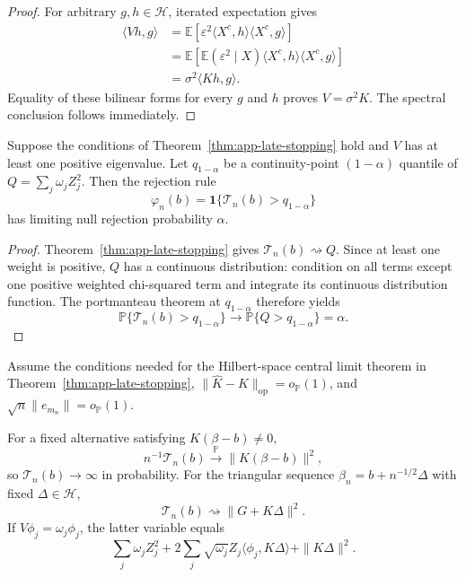 \begin{proof}
For arbitrary $g,h\in\mathcal H$, iterated expectation gives
\begin{align*}
    \langle Vh,g\rangle
    &=\mathbb E\!\left[
       \varepsilon^2\langle X^c,h\rangle\langle X^c,g\rangle
      \right] \\
    &=\mathbb E\!\left[
       \mathbb E(\varepsilon^2\mid X)
       \langle X^c,h\rangle\langle X^c,g\rangle
      \right] \\
    &=\sigma^2\langle Kh,g\rangle.
\end{align*}
Equality of these bilinear forms for every $g$ and $h$ proves
$V=\sigma^2K$.  The spectral conclusion follows immediately.
\end{proof}

\begin{corollary}
\label{cor:app-asymptotic-size}
Suppose the conditions of Theorem~\ref{thm:app-late-stopping} hold and $V$ has
at least one positive eigenvalue.  Let $q_{1-\alpha}$ be a continuity-point
$(1-\alpha)$ quantile of $Q=\sum_j\omega_jZ_j^2$.  Then the rejection rule
\[
    \varphi_n(b)=\mathbf 1\{\mathcal T_n(b)>q_{1-\alpha}\}
\]
has limiting null rejection probability $\alpha$.
\end{corollary}

\begin{proof}
Theorem~\ref{thm:app-late-stopping} gives
$\mathcal T_n(b)\rightsquigarrow Q$.  Since at least one weight is positive,
$Q$ has a continuous distribution: condition on all terms except one positive
weighted chi-squared term and integrate its continuous distribution function.
The portmanteau theorem at $q_{1-\alpha}$ therefore yields
\[
    \mathbb P\{\mathcal T_n(b)>q_{1-\alpha}\}
    \longrightarrow
    \mathbb P\{Q>q_{1-\alpha}\}=\alpha.
\]
\end{proof}

\begin{proposition}
\label{prop:app-inference-alternatives}
Assume the conditions needed for the Hilbert-space central limit theorem in
Theorem~\ref{thm:app-late-stopping},
$\|\widehat K-K\|_{\mathrm{op}}=o_{\mathbb P}(1)$, and
$\sqrt n\|e_{m_n}\|=o_{\mathbb P}(1)$.

For a fixed alternative satisfying $K(\beta-b)\neq0$,
\[
    n^{-1}\mathcal T_n(b)
    \xrightarrow{\mathbb P}
    \|K(\beta-b)\|^2,
\]
so $\mathcal T_n(b)\to\infty$ in probability.  For the triangular sequence
$\beta_n=b+n^{-1/2}\Delta$ with fixed $\Delta\in\mathcal H$,
\[
    \mathcal T_n(b)\rightsquigarrow\|G+K\Delta\|^2.
\]
If $V\phi_j=\omega_j\phi_j$, the latter variable equals
\[
 \sum_j\omega_jZ_j^2
 +2\sum_j\sqrt{\omega_j}Z_j\langle\phi_j,K\Delta\rangle
 +\|K\Delta\|^2.
\]
\end{proposition}

